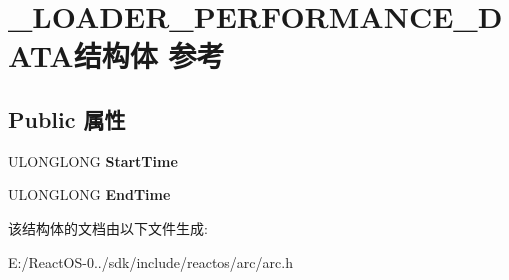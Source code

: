 \hypertarget{struct___l_o_a_d_e_r___p_e_r_f_o_r_m_a_n_c_e___d_a_t_a}{}\section{\+\_\+\+L\+O\+A\+D\+E\+R\+\_\+\+P\+E\+R\+F\+O\+R\+M\+A\+N\+C\+E\+\_\+\+D\+A\+T\+A结构体 参考}
\label{struct___l_o_a_d_e_r___p_e_r_f_o_r_m_a_n_c_e___d_a_t_a}
\subsection*{Public 属性}
\begin{DoxyCompactItemize}
\item 
\mbox{\label{struct___l_o_a_d_e_r___p_e_r_f_o_r_m_a_n_c_e___d_a_t_a_a7b527f7cc6ef79e9a86629dc4d272e75}} 
U\+L\+O\+N\+G\+L\+O\+NG {\bfseries Start\+Time}
\item 
\mbox{\label{struct___l_o_a_d_e_r___p_e_r_f_o_r_m_a_n_c_e___d_a_t_a_a4a5aabf0b0c204b7334cb319836b660d}} 
U\+L\+O\+N\+G\+L\+O\+NG {\bfseries End\+Time}
\end{DoxyCompactItemize}


该结构体的文档由以下文件生成\+:\begin{DoxyCompactItemize}
\item 
E\+:/\+React\+O\+S-\/0../sdk/include/reactos/arc/arc.\+h\end{DoxyCompactItemize}
